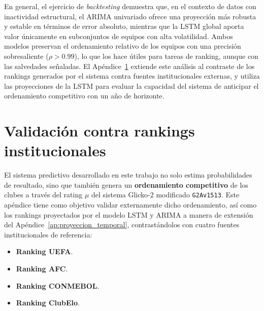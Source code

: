 En general, el ejercicio de \textit{backtesting} demuestra que, en el contexto de datos con inactividad estructural, el ARIMA univariado ofrece una proyecci\'on m\'as robusta y estable en t\'erminos de error absoluto, mientras que la LSTM global aporta valor \'unicamente en subconjuntos de equipos con alta volatilidad. Ambos modelos preservan el ordenamiento relativo de los equipos con una precisi\'on sobresaliente (\(\rho > 0.99\)), lo que los hace \'utiles para tareas de ranking, aunque con las salvedades se\~naladas. El Ap\'endice~\ref{ap:validacion} extiende este an\'alisis al contraste de los rankings generados por el sistema contra fuentes institucionales externas, y utiliza las proyecciones de la LSTM para evaluar la capacidad del sistema de anticipar el ordenamiento competitivo con un a\~no de horizonte.



\chapter{Validaci\'on contra rankings institucionales}
\label{ap:validacion}

El sistema predictivo desarrollado en este trabajo no solo estima probabilidades de resultado, sino que tambi\'en genera un \textbf{ordenamiento competitivo} de los clubes a trav\'es del rating \(\mu\) del sistema Glicko‑2 modificado \texttt{G2Av1513}. Este ap\'endice tiene como objetivo validar externamente dicho ordenamiento, as\'i como los rankings proyectados por el modelo LSTM y ARIMA a manera de extensi\'on del Ap\'endice~\ref{ap:proyeccion_temporal}, contrast\'andolos con cuatro fuentes institucionales de referencia:

\begin{itemize}
	\item \textbf{Ranking UEFA}. \cite{kassiesa2025, kassiesa2026}
	\item \textbf{Ranking AFC}. \cite{footyrankings2025,footyrankings2026}
	\item \textbf{Ranking CONMEBOL}. \cite{conmebol2026}
	\item \textbf{Ranking ClubElo}. \cite{clubelo2025}
\end{itemize}

